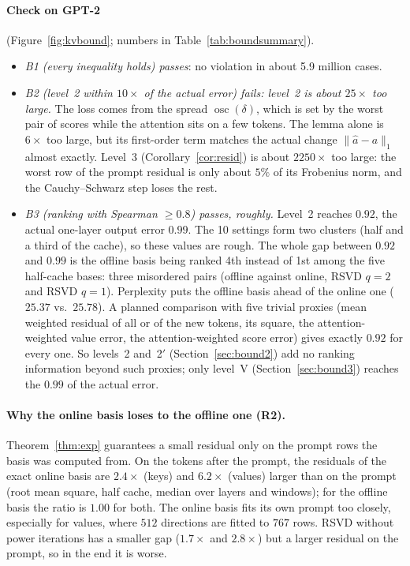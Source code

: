 \documentclass[10pt]{article}
\theoremstyle{plain}
\theoremstyle{definition}
\theoremstyle{remark}
\DeclareMathOperator{\osc}{osc}
\newcommand{\rl}[1]{\textsf{#1}}%
\begin{document}
\paragraph{Check on GPT-2} (Figure~\ref{fig:kvbound}; numbers in Table~\ref{tab:boundsummary}).
\begin{itemize}[leftmargin=2em,itemsep=1pt]
\item \emph{\rl{B1} (every inequality holds) passes}: no violation in about 5.9 million cases.
\item \emph{\rl{B2} (level~2 within $10\times$ of the actual error) fails: level~2 is about $25\times$ too large.} The loss comes from the spread $\osc(\delta)$, which is set by the worst pair of scores while the attention sits on a few tokens. The lemma alone is $6\times$ too large, but its first-order term matches the actual change $\lVert\hat a-a\rVert_1$ almost exactly. Level~3 (Corollary~\ref{cor:resid}) is about $2250\times$ too large: the worst row of the prompt residual is only about $5\%$ of its Frobenius norm, and the Cauchy--Schwarz step loses the rest.
\item \emph{\rl{B3} (ranking with Spearman $\ge0.8$) passes, roughly.} Level~2 reaches $0.92$, the actual one-layer output error $0.99$. The 10 settings form two clusters (half and a third of the cache), so these values are rough. The whole gap between $0.92$ and $0.99$ is the offline basis being ranked 4th instead of 1st among the five half-cache bases: three misordered pairs (offline against online, RSVD $q=2$ and RSVD $q=1$). Perplexity puts the offline basis ahead of the online one ($25.37$ vs.\ $25.78$). A planned comparison with five trivial proxies (mean weighted residual of all or of the new tokens, its square, the attention-weighted value error, the attention-weighted score error) gives exactly $0.92$ for every one. So levels~2 and~2$'$ (Section~\ref{sec:bound2}) add no ranking information beyond such proxies; only level~V (Section~\ref{sec:bound3}) reaches the $0.99$ of the actual error.
\end{itemize}

\paragraph{Why the online basis loses to the offline one (\rl{R2}).}
Theorem~\ref{thm:exp} guarantees a small residual only on the prompt rows the basis was computed from. On the tokens after the prompt, the residuals of the exact online basis are $2.4\times$ (keys) and $6.2\times$ (values) larger than on the prompt (root mean square, half cache, median over layers and windows); for the offline basis the ratio is $1.00$ for both. The online basis fits its own prompt too closely, especially for values, where $512$ directions are fitted to $767$ rows. RSVD without power iterations has a smaller gap ($1.7\times$ and $2.8\times$) but a larger residual on the prompt, so in the end it is worse.
\end{document}
